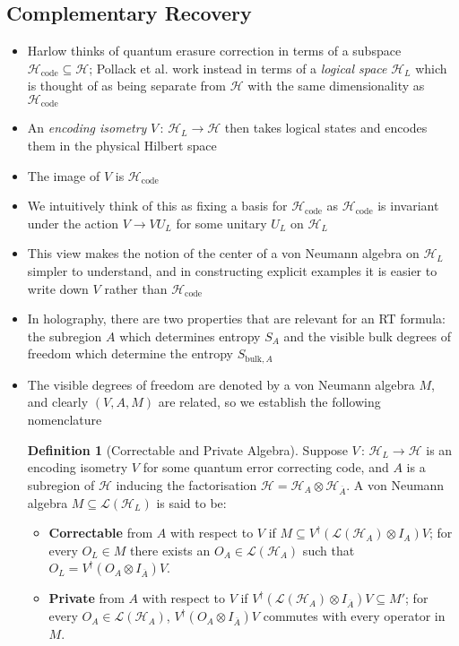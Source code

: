 \documentclass[12pt,a4paper]{article}
\numberwithin{equation}{section}
\newcommand{\Hcode}{\mathcal{H}_{\text{code}}}
\newcommand{\ol}[1]{\overline{#1}}
\theoremstyle{definition}
\newtheorem{definition}{Definition}[section]
\theoremstyle{theorem}
\theoremstyle{example}
\begin{document}
	\subsection{Complementary Recovery}
	\begin{itemize}
		\item Harlow thinks of quantum erasure correction in terms of a subspace $\Hcode\subseteq\mathcal{H}$; Pollack et al. work instead in terms of a \textit{logical space} $\mathcal{H}_{L}$ which is thought of as being separate from $\mathcal{H}$ with the same dimensionality as $\Hcode$
		\item An \textit{encoding isometry} $V\,:\,\mathcal{H}_{L}\to\mathcal{H}$ then takes logical states and encodes them in the physical Hilbert space
		\item The image of $V$ is $\Hcode$
		\item We intuitively think of this as fixing a basis for $\Hcode$ as $\Hcode$ is invariant under the action $V\to VU_{L}$ for some unitary $U_{L}$ on $\mathcal{H}_{L}$
		\item This view makes the notion of the center of a von Neumann algebra on $\mathcal{H}_{L}$ simpler to understand, and in constructing explicit examples it is easier to write down $V$ rather than $\Hcode$
		\item In holography, there are two properties that are relevant for an RT formula: the subregion $A$ which determines entropy $S_{A}$ and the visible bulk degrees of freedom which determine the entropy $S_{\text{bulk},A}$
		\item The visible degrees of freedom are denoted by a von Neumann algebra $M$, and clearly $(V,A,M)$ are related, so we establish the following nomenclature
		\begin{definition}[Correctable and Private Algebra]
			Suppose $V\,:\,\mathcal{H}_{L}\to\mathcal{H}$ is an encoding isometry $V$ for some quantum error correcting code, and $A$ is a subregion of $\mathcal{H}$ inducing the factorisation $\mathcal{H}=\mathcal{H}_{A}\otimes\mathcal{H}_{\ol{A}}$. A von Neumann algebra $M\subseteq\mathcal{L}(\mathcal{H}_{L})$ is said to be:
			\begin{itemize}
				\item \textbf{Correctable} from $A$ with respect to $V$ if $M\subseteq V^{\dagger}(\mathcal{L}(\mathcal{H}_{A})\otimes I_{A})V$; for every $O_{L}\in M$ there exists an $O_{A}\in\mathcal{L}(\mathcal{H}_{A})$ such that $O_{L}=V^{\dagger}(O_{A}\otimes I_{\ol{A}})V$.
				\item \textbf{Private} from $A$ with respect to $V$ if $V^{\dagger}(\mathcal{L}(\mathcal{H}_{A})\otimes I_{\ol{A}})V\subseteq M'$; for every $O_{A}\in\mathcal{L}(\mathcal{H}_{A})$, $V^{\dagger}(O_{A}\otimes I_{\ol{A}})V$ commutes with every operator in $M$.

\end{itemize}
\end{definition}
\end{itemize}
\end{document}
